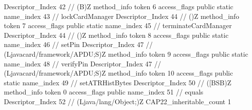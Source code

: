 {{{{{					Descriptor_Index	42		// (B)Z
				}
				method_info {
					token	6
					access_flags	public static
					name_index	43		// lockCardManager
					Descriptor_Index	44		// ()Z
				}
				method_info {
					token	7
					access_flags	public static
					name_index	45		// terminateCardManager
					Descriptor_Index	44		// ()Z
				}
				method_info {
					token	8
					access_flags	public static
					name_index	46		// setPin
					Descriptor_Index	47		// (Ljavacard/framework/APDU;S)Z
				}
				method_info {
					token	9
					access_flags	public static
					name_index	48		// verifyPin
					Descriptor_Index	47		// (Ljavacard/framework/APDU;S)Z
				}
				method_info {
					token	10
					access_flags	public static
					name_index	49		// setATRHistBytes
					Descriptor_Index	50		// ([BSB)Z
				}
				method_info {
					token	0
					access_flags	public
					name_index	51		// equals
					Descriptor_Index	52		// (Ljava/lang/Object;)Z
				}
			}
			CAP22_inheritable_count	1
		}
	}
}

